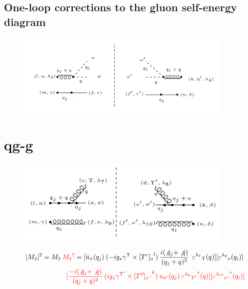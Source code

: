 \pagebreak
\subsection{One-loop corrections to the gluon self-energy diagram}
\begin{figure}[h!]
\centering
\includegraphics[width=0.95\textwidth]{images/ghostM1squer.png}
\end{figure}






\pagebreak

\section{qg-g}
\begin{figure}[ht!]
\centering
\includegraphics[width=0.95\textwidth]{images/qggM2squer.png}
\end{figure}
\begin{equation}
\begin{split}
|M_2|^2=M_2\:{\color[RGB]{255,0,0} {M_2}^{\dagger}} = [{\bar{u}}_{\sigma}(q_j)\: (-ig_s \gamma^{\Upsilon}\times {[T^c]_o}^l) \: \frac{i(\not{q_j} + \not{q})}{(q_j + q)^2}\:\: {\varepsilon^{\lambda_7}}_{\Upsilon} (q)] [{\varepsilon^{\lambda_9}}_{\nu} (q_i)]\: \\
\quad\quad\quad\quad\quad\quad\quad\quad\:\:{\color[RGB]{255,0,0}[\frac{-i(\not{q_j} + \not{q})}{(q_j + q)^2} \:  (ig_s \gamma^{{\Upsilon}^{\prime}}\times {[T^d]_{o\:^{\prime}}}^k) \: u_{{\sigma}^{\prime}}(q_j) \: {{\varepsilon^{\lambda_8}}_{{\Upsilon}^{\prime}}}^* (q)][{{\varepsilon^{\lambda_{10}}}_{{\nu}^{\prime}}}^* (q_i)]}
\end{split}
\end{equation}

